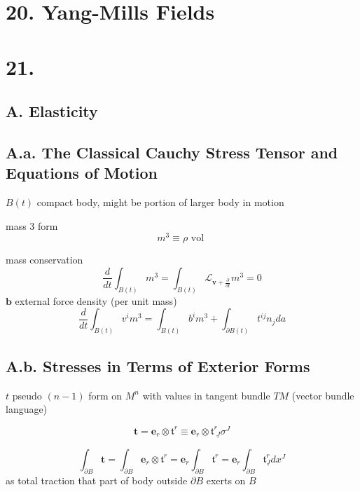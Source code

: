 

\section{20. Yang-Mills Fields }

             

\section{21.}









\begin{appendix}

\section{A. Elasticity}


\subsection{A.a. The Classical Cauchy Stress Tensor and Equations of Motion}

$B(t)$ compact body, might be portion of larger body in motion

mass 3 form 
\[
m^3 \equiv \rho \text{ vol }
\]

mass conservation
\[
\frac{d}{dt} \int_{B(t)} m^3 = \int_{B(t)} \mathcal{L}_{\textbf{v} + \frac{ \partial }{ \partial t}} m^3 = 0 
\]
$\mathbf{b}$ external force density (per unit mass)
\[
\frac{d}{dt} \int_{B(t)} v^i m^3 = \int_{B(t)} b^i m^3 + \int_{ \partial B(t)} t^{ij}n_j da
\]

\subsection{A.b. Stresses in Terms of Exterior Forms}

$t$ pseudo $(n-1)$ form on $M^n$ with values in tangent bundle $TM$ (vector bundle language)

\begin{equation}
        \mathbf{t} = \mathbf{e}_r \otimes \mathfrak{t}^r \equiv \mathbf{e}_r \otimes \mathfrak{t}^r_{ \, \, \underline{J}} \sigma^J 
\end{equation}

\[
\int_{ \partial B} \mathbf{t} = \int_{\partial B} \mathbf{e}_r \otimes \mathfrak{t}^r = \mathbf{e}_r \int_{\partial B} \mathfrak{t}^r = \mathbf{e}_r \int_{ \partial B} \mathfrak{t}^r_{ \underline{J}} dx^J
\]
as total traction that part of body outside $\partial B$ exerts on $B$


\end{appendix}
